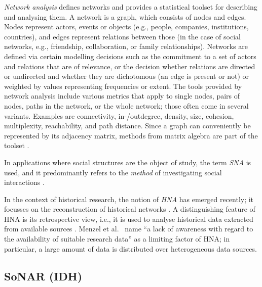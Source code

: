 \emph{Network analysis}
defines networks and provides a statistical toolset for describing and analysing them.
A network is a graph, which consists of nodes and edges.
Nodes represent actors, events or objects (e.g., people, companies, institutions, countries),
and edges represent relations between those (in the case of social networks, e.g.,
friendship, collaboration, or family relationships).
Networks are defined via certain modelling decisions
such as the commitment to a set of actors and relations that are of relevance,
or the decision whether relations are directed or undirected
and whether they are dichotomous (an edge is present or not)
or weighted by values representing frequencies or extent.
The tools provided by network analysis include
various metrics that apply to single nodes, pairs of nodes, paths in the network,
or the whole network; those often come in several variants.
Examples are connectivity, in-/outdegree, density,
size, cohesion, multiplexity, reachability, and path distance.
Since a graph can conveniently be represented by its adjacency matrix,
methods from matrix algebra are part of the toolset \autocite[cf.][§§1.1, 3.3, 5.3]{Jansen2003}.

In applications where social structures are the object of study,
the term \emph{\gls{SNA}} is used,
and it predominantly refers to the \emph{method} of investigating
social interactions \autocite{Otte2002}.

In the context of historical research,
the notion of \emph{\gls{HNA}}
has emerged recently; it focusses on the reconstruction of
historical networks \autocite{Menzel2020}.
A distinguishing feature of \gls{HNA} is its retrospective view,
i.e., it is used to analyse historical data extracted
from available sources \autocite{Fangerau2022}.
Menzel et al.\ \autocite*{Menzel2020} name
\enquote{a lack of awareness with regard to the availability of suitable research data}
as a limiting factor of \gls{HNA};
in particular, a large amount of data is distributed over heterogeneous data sources.

\subsection{SoNAR (IDH)}
\label{subsec:SoNAR_reports}

